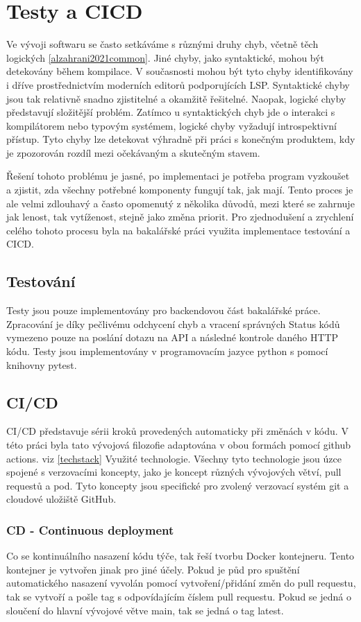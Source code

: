 \chapter{Testy a CICD} \label{testing&cicd}
Ve vývoji softwaru se často setkáváme s různými druhy chyb, včetně těch logických \ref{alzahrani2021common}. Jiné chyby, jako syntaktické, mohou být detekovány během kompilace. V současnosti mohou být tyto chyby identifikovány i dříve prostřednictvím moderních editorů podporujících LSP. Syntaktické chyby jsou tak relativně snadno zjistitelné a okamžitě řešitelné. Naopak, logické chyby představují složitější problém. Zatímco u syntaktických chyb jde o interakci s kompilátorem nebo typovým systémem, logické chyby vyžadují introspektivní přístup. Tyto chyby lze detekovat výhradně při práci s konečným produktem, kdy je zpozorován rozdíl mezi očekávaným a skutečným stavem.

Řešení tohoto problému je jasné, po implementaci je potřeba program vyzkoušet a zjistit, zda všechny potřebné komponenty fungují tak, jak mají. Tento proces je ale velmi zdlouhavý a často opomenutý z několika důvodů, mezi které se zahrnuje jak lenost, tak vytíženost, stejně jako změna priorit. Pro zjednodušení a zrychlení celého tohoto procesu byla na bakalářské práci využita implementace testování a CICD.

\section{Testování}
Testy jsou pouze implementovány pro backendovou část bakalářské práce. Zpracování je díky pečlivému odchycení chyb a vracení správných Status kódů vymezeno pouze na poslání dotazu na API a následné kontrole daného HTTP kódu. Testy jsou implementovány v programovacím jazyce python s pomocí knihovny pytest.

\section{CI/CD}
CI/CD představuje sérii kroků provedených automaticky při změnách v kódu. V této práci byla tato vývojová filozofie adaptována v obou formách pomocí github actions. viz \ref{techstack} Využité technologie. Všechny tyto technologie jsou úzce spojené s verzovacími koncepty, jako je koncept různých vývojových větví, pull requestů a pod. Tyto koncepty jsou specifické pro zvolený verzovací systém git a cloudové uložiště GitHub.

\subsection{CD - Continuous deployment}
Co se kontinuálního nasazení kódu týče, tak řeší tvorbu Docker kontejneru. Tento kontejner je vytvořen jinak pro jiné účely. Pokud je půd pro spuštění automatického nasazení vyvolán pomocí vytvoření/přidání změn do pull requestu, tak se vytvoří a pošle tag s odpovídajícím číslem pull requestu. Pokud se jedná o sloučení do hlavní vývojové větve main, tak se jedná o tag latest.

